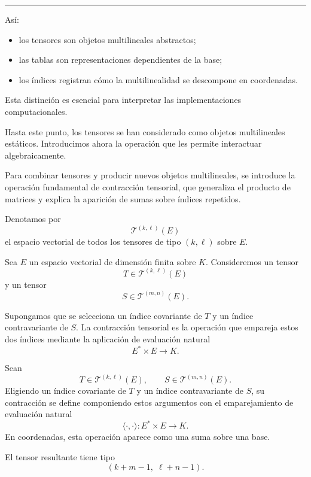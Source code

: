 \medskip
\hrule
\bigskip

Así:
\begin{itemize}
\item los tensores son objetos multilineales abstractos;
\item las tablas son representaciones dependientes de la base;
\item los índices registran cómo la multilinealidad se descompone en coordenadas.
\end{itemize}

Esta distinción es esencial para interpretar las implementaciones computacionales.

\medskip

Hasta este punto, los tensores se han considerado como objetos multilineales
estáticos.
Introducimos ahora la operación que les permite interactuar algebraicamente.


\medskip

Para combinar tensores y producir nuevos objetos multilineales, se introduce
la operación fundamental de contracción tensorial, que generaliza el producto
de matrices y explica la aparición de sumas sobre índices repetidos.

\medskip

Denotamos por
\[
\mathcal{T}^{(k,\ell)}(E)
\]
el espacio vectorial de todos los tensores de tipo $(k,\ell)$ sobre $E$.

\medskip

Sea $E$ un espacio vectorial de dimensión finita sobre $K$.
Consideremos un tensor
\[
T \in \mathcal{T}^{(k,\ell)}(E)
\]
y un tensor
\[
S \in \mathcal{T}^{(m,n)}(E).
\]

Supongamos que se selecciona un índice covariante de $T$ y un índice
contravariante de $S$.
La contracción tensorial es la operación que empareja estos dos índices mediante
la aplicación de evaluación natural
\[
E^* \times E \to K.
\]

\begin{definition}
Sean
\[
T \in \mathcal{T}^{(k,\ell)}(E),
\qquad
S \in \mathcal{T}^{(m,n)}(E).
\]
Eligiendo un índice covariante de $T$ y un índice contravariante de $S$, su
contracción se define componiendo estos argumentos con el emparejamiento de
evaluación natural
\[
\langle\cdot,\cdot\rangle : E^* \times E \to K.
\]
En coordenadas, esta operación aparece como una suma sobre una base.

\medskip

El tensor resultante tiene tipo
\[
(k+m-1,\;\ell+n-1).
\]
\end{definition}

